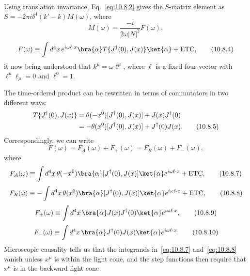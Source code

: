 Using translation invariance, Eq.~\eqref{eq:10.8.2} gives the $S$-matrix
element as $S=-2\pi i\delta^4(k'-k)M(\omega)$, where
\begin{equation}
  M(\omega)=\frac{-i}{2\omega|N|^2}F(\omega),
  \tag{10.8.3}\label{eq:10.8.3}
\end{equation}
\begin{equation}
  F(\omega)\equiv\int d^4x\,e^{i\omega\ell\cdot x}
  \bra{\alpha}T\{J^\dagger(0),J(x)\}\ket{\alpha}+\mathrm{ETC},
  \tag{10.8.4}\label{eq:10.8.4}
\end{equation}
it now being understood that $k^\mu=\omega\ell^\mu$, where $\ell$ is a
fixed four-vector with $\ell^\mu\ell_\mu=0$ and $\ell^0=1$.

The time-ordered product can be rewritten in terms of commutators in two
different ways:
\begin{align}
  T\{J^\dagger(0),J(x)\}
  &=\theta(-x^0)[J^\dagger(0),J(x)]+J(x)J^\dagger(0)\notag\\
  &=-\theta(x^0)[J^\dagger(0),J(x)]+J^\dagger(0)J(x).
  \tag{10.8.5}\label{eq:10.8.5}
\end{align}
Correspondingly, we can write
\begin{equation}
  F(\omega)=F_A(\omega)+F_+(\omega)=F_R(\omega)+F_-(\omega),
  \tag{10.8.6}\label{eq:10.8.6}
\end{equation}
where
\begin{equation}
  F_A(\omega)\equiv\int d^4x\,\theta(-x^0)
  \bra{\alpha}[J^\dagger(0),J(x)]\ket{\alpha}
  e^{i\omega\ell\cdot x}+\mathrm{ETC},
  \tag{10.8.7}\label{eq:10.8.7}
\end{equation}
\begin{equation}
  F_R(\omega)\equiv-\int d^4x\,\theta(x^0)
  \bra{\alpha}[J^\dagger(0),J(x)]\ket{\alpha}
  e^{i\omega\ell\cdot x}+\mathrm{ETC},
  \tag{10.8.8}\label{eq:10.8.8}
\end{equation}
\begin{equation}
  F_+(\omega)\equiv\int d^4x\,
  \bra{\alpha}J(x)J^\dagger(0)\ket{\alpha}e^{i\omega\ell\cdot x},
  \tag{10.8.9}\label{eq:10.8.9}
\end{equation}
\begin{equation}
  F_-(\omega)\equiv\int d^4x\,
  \bra{\alpha}J^\dagger(0)J(x)\ket{\alpha}e^{i\omega\ell\cdot x}.
  \tag{10.8.10}\label{eq:10.8.10}
\end{equation}
Microscopic causality tells us that the integrands in~\eqref{eq:10.8.7}
and~\eqref{eq:10.8.8} vanish unless $x^\mu$ is within the light cone, and
the step functions then require that $x^\mu$ is in the backward light cone
